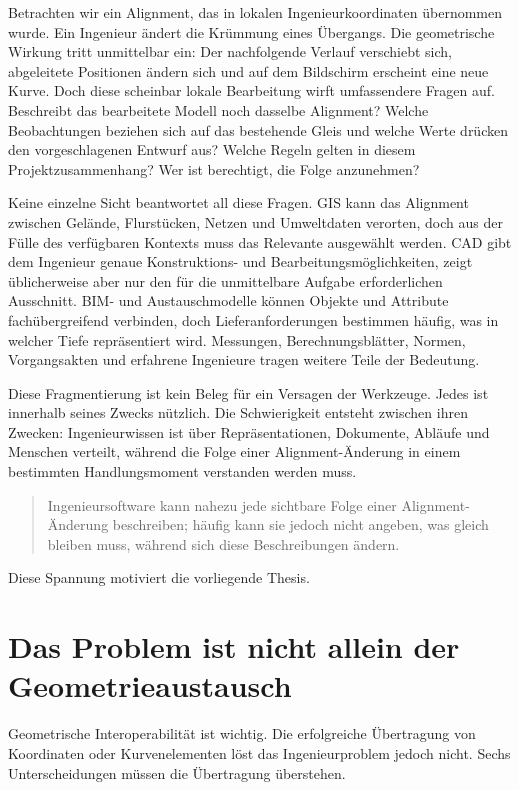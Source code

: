 Betrachten wir ein Alignment, das in lokalen Ingenieurkoordinaten übernommen
wurde. Ein Ingenieur ändert die Krümmung eines Übergangs. Die geometrische
Wirkung tritt unmittelbar ein: Der nachfolgende Verlauf verschiebt sich,
abgeleitete Positionen ändern sich und auf dem Bildschirm erscheint eine neue
Kurve. Doch diese scheinbar lokale Bearbeitung wirft umfassendere Fragen auf.
Beschreibt das bearbeitete Modell noch dasselbe Alignment? Welche
Beobachtungen beziehen sich auf das bestehende Gleis und welche Werte drücken
den vorgeschlagenen Entwurf aus? Welche Regeln gelten in diesem
Projektzusammenhang? Wer ist berechtigt, die Folge anzunehmen?

Keine einzelne Sicht beantwortet all diese Fragen. GIS kann das Alignment
zwischen Gelände, Flurstücken, Netzen und Umweltdaten verorten, doch aus der
Fülle des verfügbaren Kontexts muss das Relevante ausgewählt werden. CAD gibt
dem Ingenieur genaue Konstruktions- und Bearbeitungsmöglichkeiten, zeigt
üblicherweise aber nur den für die unmittelbare Aufgabe erforderlichen
Ausschnitt. BIM- und Austauschmodelle können Objekte und Attribute
fachübergreifend verbinden, doch Lieferanforderungen bestimmen häufig, was in
welcher Tiefe repräsentiert wird. Messungen, Berechnungsblätter, Normen,
Vorgangsakten und erfahrene Ingenieure tragen weitere Teile der Bedeutung.

Diese Fragmentierung ist kein Beleg für ein Versagen der Werkzeuge. Jedes ist
innerhalb seines Zwecks nützlich. Die Schwierigkeit entsteht zwischen ihren
Zwecken: Ingenieurwissen ist über Repräsentationen, Dokumente, Abläufe und
Menschen verteilt, während die Folge einer Alignment-Änderung in einem
bestimmten Handlungsmoment verstanden werden muss.

\begin{quote}
Ingenieursoftware kann nahezu jede sichtbare Folge einer Alignment-Änderung
beschreiben; häufig kann sie jedoch nicht angeben, was gleich bleiben muss,
während sich diese Beschreibungen ändern.
\end{quote}

Diese Spannung motiviert die vorliegende Thesis.

\section{Das Problem ist nicht allein der Geometrieaustausch}

Geometrische Interoperabilität ist wichtig. Die erfolgreiche Übertragung von
Koordinaten oder Kurvenelementen löst das Ingenieurproblem jedoch nicht. Sechs
Unterscheidungen müssen die Übertragung überstehen.

